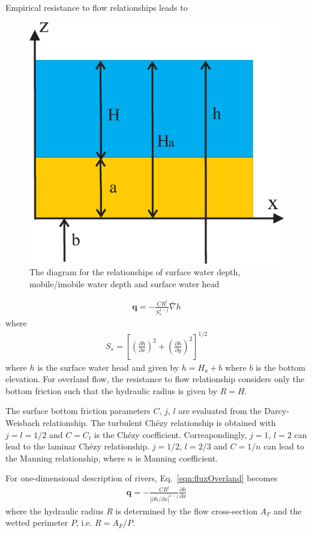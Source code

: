 Empirical resistance to flow relationships leads to \cite{VKwaak:99}
%
\begin{figure} [htb!]
 \centering
 \includegraphics[width=0.75\columnwidth] {H_SFC/figures/SFlow.eps}
 \caption{The diagram for the relationships of surface water depth, mobile/imobile water depth and surface water head}
 \label{OLF:SurfaceFlow}
\end{figure}
%
\begin{eqnarray}
\mathbf q = -\frac{C R^l}{S_s^{1-j}} \bar\nabla h 
\label{eqn:fluxOverland}
\end{eqnarray}
%
where%
\begin{eqnarray}
S_s =\left[
\left(\frac{\partial h}{\partial x}\right)^2  +
\left(\frac{\partial h}{\partial y}\right)^2
\right]^{1/2} 
\label{eqn:OLF_Ss}
\end{eqnarray}
%
where $h$ is the surface water head and given by $h = H_a + b$ where $b$ is the bottom elevation. For overland flow, the resistance to flow relationship considers only the bottom friction such that the hydraulic radius is given by $R=H$. 

The surface bottom friction parameters $C$, $j$, $l$ are evaluated from the Darcy-Weisbach relationship. The turbulent Ch\'ezy relationship is obtained with $j = l = 1 / 2$ and $C = C_t$ is the Ch\'ezy coefficient. Correapondingly, $j = 1$, $l = 2$ can lead to the laminar Ch\'ezy relationship. $j = 1/2$, $l= 2/3$ and $C= 1/n$ can lead to the Manning relationship, where $n$ is Manning coefficient.

For one-dimensional description of rivers, Eq.~\ref{eqn:fluxOverland} becomes \cite{Jul:02}
%
\begin{eqnarray}
\mathbf q = -\frac{C R^l}{|\partial h / \partial x|^{1-j}} \frac{\partial h}{\partial x} \label{eqn:fluxRiver}
\end{eqnarray}
%
where the hydraulic radius $R$ is determined by the flow cross-section $A_F$ and the wetted perimeter $P$, i.e. $R=A_F/P$.

